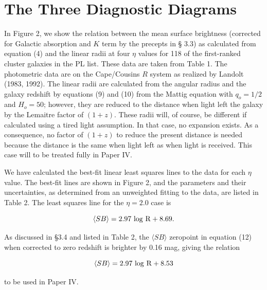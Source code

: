 \documentclass[preprint]{aastex}
\begin{document}
\section{The Three Diagnostic Diagrams}

In Figure 2, we show the relation between the mean surface brightness
(corrected for Galactic absorption and $K$ term by the precepts in \S
3.3) as calculated from equation (4) and the linear radii at four
$\eta$ values for 118 of the first-ranked cluster galaxies in the PL
list. These data are taken from Table 1. The photometric data are on
the Cape/Cousins $R$ system as realized by Landolt (1983, 1992). The
linear radii are calculated from the angular radius and the galaxy
redshift by equations (9) and (10) from the Mattig equation with $q_o
= 1/2$ and $H_o = 50$; however, they are reduced to the distance when
light left the galaxy by the Lemaitre factor of $(1 + z)$. These radii
will, of course, be different if calculated using a tired light
assumption.  In that case, no expansion exists. As a consequence, no
factor of $(1 + z)$ to reduce the present distance is needed because
the distance is the same when light left as when light is
received. This case will to be treated fully in Paper IV.

We have calculated the best-fit linear least squares lines to the data
for each $\eta$ value.  The best-fit lines are shown in Figure 2, and
the parameters and their uncertainties, as determined from an
unweighted fitting to the data, are listed in Table 2.  The least
squares line for the $\eta = 2.0$ case is

\begin{equation}                 
	{\langle SB \rangle} = 2.97~{\rm log~R} + 8.69. 
\end{equation}

\noindent As discussed in \S 3.4 and listed in Table 2, the $\langle
SB \rangle$ zeropoint in equation (12) when corrected to zero redshift
is brighter by 0.16 mag, giving the relation

\begin{equation}
          {\langle SB \rangle} = 2.97~{\rm log~R} + 8.53
\end{equation}

\noindent to be used in Paper IV. 
\end{document}
